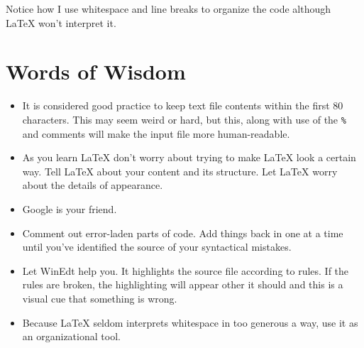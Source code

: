 \ovalbox{
    \begin{minipage}{\linewidth}
\begin{verbatim}
\[
\mathbf{1}_{\mathcal{X}}(x) =
\begin{cases}
  1, & x \in \mathcal{X} \\
  0, & \textrm{otherwise}
\end{cases}.
\]
\end{verbatim}
    \end{minipage}
  } Notice how I use whitespace and line breaks to organize the code
  although \LaTeX{} won't interpret it.

\section{Words of Wisdom}

\begin{itemize}
\item It is considered good practice to keep text file contents within
  the first 80 characters. This may seem weird or hard, but this,
  along with use of the \texttt{\%} and comments will make the input
      file more human-readable.
    \item As you learn \LaTeX{} don't worry about trying to make
      \LaTeX{} look a certain way. Tell \LaTeX{} about your content
      and its structure. Let \LaTeX{} worry about the details of
      appearance.
    \item Google is your friend.

    \item Comment out error-laden parts of code. Add things back in
      one at a time until you've identified the source of your
      syntactical mistakes.

    \item Let WinEdt help you. It highlights the source file according
      to rules. If the rules are broken, the highlighting will appear
      other it should and this is a visual cue that something is
      wrong.

    \item Because \LaTeX{} seldom interprets whitespace in too
      generous a way, use it as an organizational tool.
\end{itemize}


